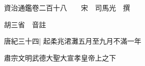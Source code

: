 






























































資治通鑑卷二百十八　　宋　司馬光　撰

胡三省　音註

唐紀三十四|{
	起柔兆涒灘五月至九月不滿一年}


肅宗文明武德大聖大宣孝皇帝上之下

